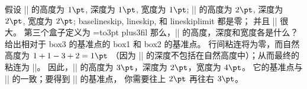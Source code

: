 \dangerexercise 假设 || 的高度为 $1\pt$, 深度为 $1\pt$, 宽度为 $1\pt$;
|| 的高度为 $2\pt$, 深度为 $2\pt$, 宽度为 $2\pt$;
baselineskip, lineskip, 和 lineskiplimit 都是零；
并且 |\boxmaxdepth| 很大。%
第三个盒子定义为
\begintt
{}=\vbox to3pt{\vskip-3pt plus3fil}
\endtt
那么，|| 的高度，深度和宽度各是什么？
给出相对于 box3 的基准点的 box1 和 box2 的基准点。
\answer 行间粘连将为零，而自然高度为 $1+1-3+2=1\pt$%
（因为 || 的深度不包括在自然高度中）；从而最终的粘连为 |\vskip-1pt|。
因此，|| 的高度为 $3\pt$，深度为 $2\pt$，宽度为 $4\pt$。
它的基准点与 || 的一致；要得到 || 的基准点，
你需要往上 $2\pt$ 再往右 $3\pt$。

